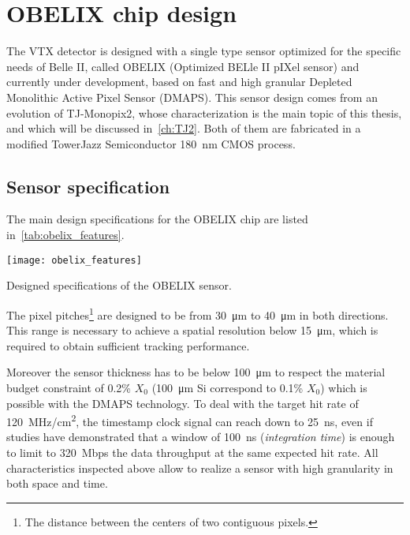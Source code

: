 \clearpage

\section{OBELIX chip design}

The VTX detector is designed with a single type sensor optimized for the specific needs of Belle II, called OBELIX (Optimized BELle II pIXel sensor) and currently under development, based on fast and high granular Depleted Monolithic Active Pixel Sensor (DMAPS). This sensor design comes from an evolution of TJ-Monopix2, whose characterization is the main topic of this thesis, and which will be discussed in~\autoref{ch:TJ2}. Both of them are fabricated in a modified TowerJazz Semiconductor \SI{180}{nm} CMOS process.\\


\subsection{Sensor specification}

The main design specifications for the OBELIX chip are listed in~\autoref{tab:obelix_features}.

\begin{table}[h!]
\centering
\texttt{[image: obelix\_features]}
\caption{Designed specifications of the OBELIX sensor.}
\label{tab:obelix_features}
\end{table}

The pixel pitches\footnote{The distance between the centers of two contiguous pixels.} are designed to be from \SI{30}{\micro m} to \SI{40}{\micro m} in both directions. This range is necessary to achieve a spatial resolution below \SI{15}{\micro m}, which is required to obtain sufficient tracking performance.

Moreover the sensor thickness has to be below \SI{100}{\micro m} to respect the material budget constraint of 0.2\% $X_{0}$ (\SI{100}{\micro m} Si correspond to 0.1\% $X_{0}$) which is possible with the DMAPS technology. 
To deal with the target hit rate of \SI{120}{MHz/cm^{2}}, the timestamp clock signal can reach down to \SI{25}{ns}, even if studies have demonstrated that a window of \SI{100}{ns} (\textit{integration time}) is enough to limit to \SI{320}{Mbps} the data throughput at the same expected hit rate. 
All characteristics inspected above allow to realize a sensor with high granularity in both space and time.\\

